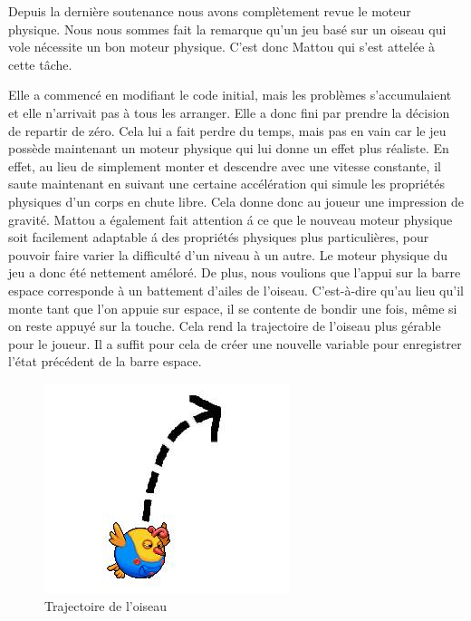 \documentclass [11pt]{report}
\begin{document}
		Depuis la dernière soutenance nous avons complètement revue le moteur physique. Nous nous sommes fait la remarque qu'un jeu bas\'e sur un oiseau qui vole nécessite un bon moteur physique. C'est donc Mattou qui s'est attelée \`a cette t\^ache. \\
		
		\vspace{6mm}
		
		Elle a commencé en modifiant le code initial, mais les problèmes s'accumulaient et elle n'arrivait pas \`a tous les arranger. Elle a donc fini par prendre la décision de repartir de zéro. Cela lui a fait perdre du temps, mais pas en vain car le jeu possède maintenant un moteur physique qui lui donne un effet plus r\'ealiste. En effet, au lieu de simplement monter et descendre avec une vitesse constante, il saute maintenant en suivant une certaine accélération qui simule les propri\'et\'es physiques d'un corps en chute libre. Cela donne donc au joueur une impression de gravit\'e. Mattou a \'egalement fait attention \'a ce que le nouveau moteur physique soit facilement adaptable \'a des propri\'et\'es physiques plus particulières, pour pouvoir faire varier la difficult\'e d'un niveau \`a un autre. Le moteur physique du jeu a donc \'et\'e nettement am\'elor\'e. De plus, nous voulions que l'appui sur la barre espace corresponde à un battement d'ailes de l'oiseau. C'est-à-dire qu'au lieu qu'il monte tant que l'on appuie sur espace, il se contente de bondir une fois, même si on reste appuyé sur la touche.   Cela rend la trajectoire de l'oiseau plus gérable pour le joueur. Il a suffit pour cela de créer une nouvelle variable pour enregistrer l'état précédent de la barre espace.\\
				
		\vspace{3mm}
				
		\begin{figure}[h]
			\centering
			\includegraphics[width=0.4\linewidth]{images/trajectoire.jpg}
			\caption[Editeur de Maps]{Trajectoire de l'oiseau}
			\label{fig:Editeur}
		\end{figure}
	
\end{document}
